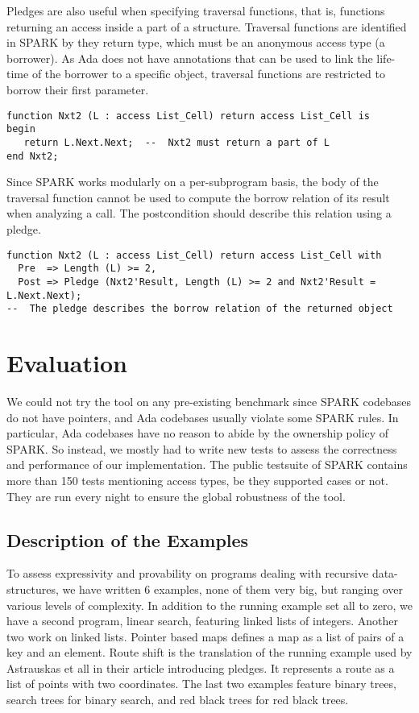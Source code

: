 \documentclass[runningheads]{llncs}
\begin{document}
Pledges are also useful when specifying traversal functions, that is, functions returning an access inside a part of a structure. Traversal functions are identified in SPARK by they return type, which must be an anonymous access type (a borrower). As Ada does not have annotations that can be used to link the life-time of the borrower to a specific object, traversal functions are restricted to borrow their first parameter.
\begin{lstlisting}
function Nxt2 (L : access List_Cell) return access List_Cell is
begin
   return L.Next.Next;  --  Nxt2 must return a part of L
end Nxt2;
\end{lstlisting}
Since SPARK works modularly on a per-subprogram basis, the body of the traversal function cannot be used to compute the borrow relation of its result when analyzing a call. The postcondition should describe this relation using a pledge.
\begin{lstlisting}
function Nxt2 (L : access List_Cell) return access List_Cell with
  Pre  => Length (L) >= 2,
  Post => Pledge (Nxt2'Result, Length (L) >= 2 and Nxt2'Result = L.Next.Next);
--  The pledge describes the borrow relation of the returned object
\end{lstlisting}
\section{Evaluation}
We could not try the tool on any pre-existing benchmark since SPARK codebases do not have pointers, and Ada codebases usually violate some SPARK rules. In particular, Ada codebases have no reason to abide by the ownership policy of SPARK. So instead, we mostly had to write new tests to assess the correctness and performance of our implementation.
The public testsuite of SPARK contains more than 150 tests mentioning access types, be they supported cases or not. They are run every night to ensure the global robustness of the tool.
\subsection{Description of the Examples}
To assess expressivity and provability on programs dealing with recursive data-structures, we have written 6 examples, none of them very big, but ranging over various levels of complexity. In addition to the running example set all to zero, we have a second program, linear search, featuring linked lists of integers. Another two work on linked lists. Pointer based maps defines a map as a list of pairs of a key and an element. Route shift is the translation of the running example used by Astrauskas et all in their article introducing pledges. It represents a route as a list of points with two coordinates. The last two examples feature binary trees, search trees for binary search, and red black trees for red black trees.
\end{document}
